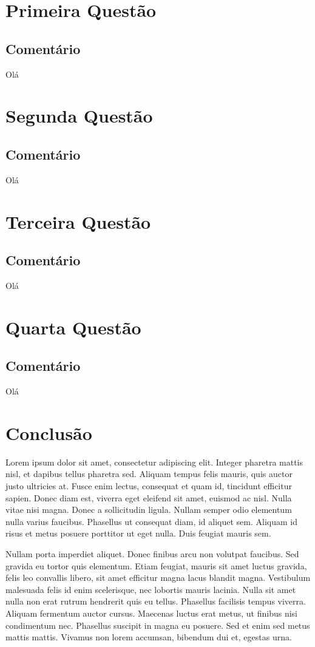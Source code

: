\documentclass[12pt, a4paper]{article}
\begin{document}
\section{Primeira Questão}
	\subsection{Comentário}
		Olá
\section{Segunda Questão}
	\subsection{Comentário}
		Olá
\section{Terceira Questão}
	\subsection{Comentário}
		Olá
\section{Quarta Questão}
	\subsection{Comentário}
		Olá
\section{Conclusão}
Lorem ipsum dolor sit amet, consectetur adipiscing elit. Integer pharetra mattis nisl, et dapibus tellus pharetra sed. Aliquam tempus felis mauris, quis auctor justo ultricies at. Fusce enim lectus, consequat et quam id, tincidunt efficitur sapien. Donec diam est, viverra eget eleifend sit amet, euismod ac nisl. Nulla vitae nisi magna. Donec a sollicitudin ligula. Nullam semper odio elementum nulla varius faucibus. Phasellus ut consequat diam, id aliquet sem. Aliquam id risus et metus posuere porttitor ut eget nulla. Duis feugiat mauris sem.

Nullam porta imperdiet aliquet. Donec finibus arcu non volutpat faucibus. Sed gravida eu tortor quis elementum. Etiam feugiat, mauris sit amet luctus gravida, felis leo convallis libero, sit amet efficitur magna lacus blandit magna. Vestibulum malesuada felis id enim scelerisque, nec lobortis mauris lacinia. Nulla sit amet nulla non erat rutrum hendrerit quis eu tellus. Phasellus facilisis tempus viverra. Aliquam fermentum auctor cursus. Maecenas luctus erat metus, ut finibus nisi condimentum nec. Phasellus suscipit in magna eu posuere. Sed et enim sed metus mattis mattis. Vivamus non lorem accumsan, bibendum dui et, egestas urna.
\end{document}
